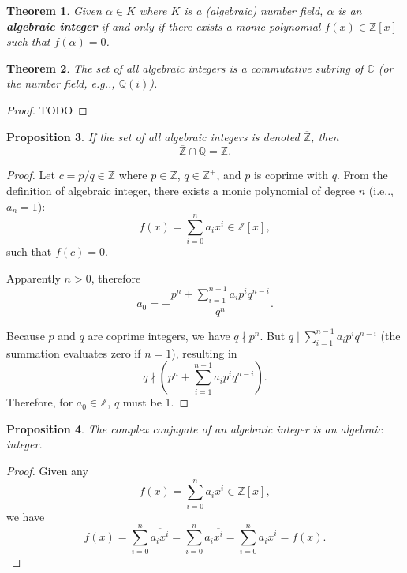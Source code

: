 \documentclass[12pt, letterpaper]{article}
\makeatletter
\newcommand{\inte}{\mathbb{Z}}
\newcommand{\rat}{\mathbb{Q}}
\newcommand{\co}{\mathbb{C}}
\newcommand\ie{i.e\@ifnextchar.{}{.\@}}
\newcommand\eg{e.g\@ifnextchar.{}{.\@}}
\newcommand{\red}[1]{{\color{red} #1}}
\newcommand{\conj}{\overline}
\newtheorem{prop}{Proposition}[section]
\newtheorem{thm}[prop]{Theorem}
\theoremstyle{definition}
\theoremstyle{remark}
\theoremstyle{definition}
\theoremstyle{plain}
\numberwithin{equation}{section}
\makeatother
\begin{document}
	\begin{thm}		
		Given $\alpha\in K$ where $K$ is a (algebraic) number field,
		$\alpha$ is an \textbf{algebraic integer} if and only if
		there exists a monic polynomial
		$f(x)\in\inte[x]$ such that $f(\alpha)=0$.
	\end{thm}
	\begin{thm}
		The set of all algebraic integers is a commutative subring of $\co$ (or the number field, \eg, $\rat(i)$).
	\end{thm}
	\begin{proof}
		\red{TODO}
	\end{proof}
	\begin{prop}
		If the set of all algebraic integers is denoted $\overline{\inte}$, then
		\[\overline{\inte}\cap\rat=\inte.\]
	\end{prop}
	\begin{proof}
		Let $c=p/q\in\overline{\inte}$ where $p\in \inte$, $q\in\inte^+$, and $p$ is coprime with $q$.
		From the definition of algebraic integer, there exists a monic polynomial of degree $n$ (\ie, $a_n=1$):
		\[f(x) = \sum_{i=0}^{n} a_ix^i \in \inte[x],\]
		such that $f(c)=0$.
		
		Apparently $n>0$, therefore
		\[a_0=-\frac{p^n+\sum_{i=1}^{n-1} a_ip^iq^{n-i}}{q^n}. \]
		
		Because $p$ and $q$ are coprime integers, we have $q \nmid p^n$. But $q \mid \sum_{i=1}^{n-1} a_ip^iq^{n-i}$ (the summation evaluates zero if $n=1$), resulting in \[q\nmid \left(p^n+\sum_{i=1}^{n-1} a_ip^iq^{n-i}\right).\]
		Therefore, for $a_0\in\inte$, $q$ must be 1.
	\end{proof}
	\begin{prop}
		The complex conjugate of an algebraic integer is an algebraic integer.
	\end{prop}
	\begin{proof}
		Given any
		\[f(x) = \sum_{i=0}^{n} a_ix^i \in \inte[x],\]
		we have
		\[\conj{f(x)}=\sum_{i=0}^{n} \conj{a_ix^i}=\sum_{i=0}^{n} a_i\conj{x^i}=\sum_{i=0}^{n} a_i\conj{x}^i=f(\conj{x}).\]
	\end{proof}
\end{document}
